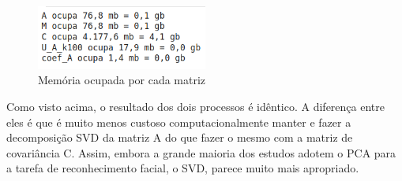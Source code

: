 \documentclass[12pt]{article}
\begin{document}
        \begin{figure}[H]
                  \centering
                  \includegraphics[width=0.5\textwidth]{img/memoria_ocupada.png}
                  \caption{Memória ocupada por cada matriz}
                  \label{fig:exemplo}
        \end{figure}

        Como visto acima, o resultado dos dois processos é idêntico. A diferença entre eles é que é muito menos custoso computacionalmente manter e fazer a decomposição SVD da matriz A do que fazer o mesmo com a matriz de covariância C. Assim, embora a grande maioria dos estudos  adotem  o  PCA  para  a  tarefa  de  reconhecimento  facial,  o  SVD,  parece muito mais apropriado.

    
    
    \newpage
    \nocite{*}
    {}
      
\end{document}
